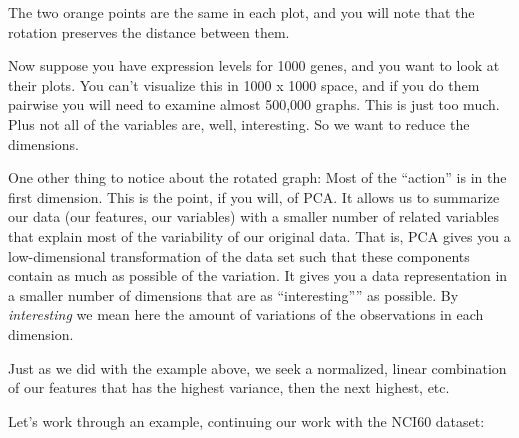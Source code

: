 \documentclass[
]{article}
\begin{document}
The two orange points are the same in each plot, and you will note that
the rotation preserves the distance between them.

Now suppose you have expression levels for 1000 genes, and you want to
look at their plots. You can't visualize this in 1000 x 1000 space, and
if you do them pairwise you will need to examine almost 500,000 graphs.
This is just too much. Plus not all of the variables are, well,
interesting. So we want to reduce the dimensions.

One other thing to notice about the rotated graph: Most of the
``action'' is in the first dimension. This is the point, if you will, of
PCA. It allows us to summarize our data (our features, our variables)
with a smaller number of related variables that explain most of the
variability of our original data. That is, PCA gives you a
low-dimensional transformation of the data set such that these
components contain as much as possible of the variation. It gives you a
data representation in a smaller number of dimensions that are as
``interesting'''' as possible. By \emph{interesting} we mean here the
amount of variations of the observations in each dimension.

Just as we did with the example above, we seek a normalized, linear
combination of our features that has the highest variance, then the next
highest, etc.

Let's work through an example, continuing our work with the NCI60
dataset:
\end{document}
